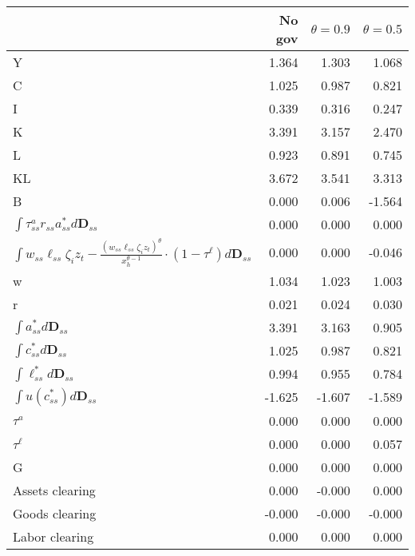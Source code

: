 \begin{tabular}{lrrr}
\toprule
 & No gov & $\theta=0.9$ & $\theta=0.5$ \\
\midrule
Y & 1.364 & 1.303 & 1.068 \\
C & 1.025 & 0.987 & 0.821 \\
I & 0.339 & 0.316 & 0.247 \\
K & 3.391 & 3.157 & 2.470 \\
L & 0.923 & 0.891 & 0.745 \\
KL & 3.672 & 3.541 & 3.313 \\
B & 0.000 & 0.006 & -1.564 \\
$\int \tau^{a}_{ss}r_{ss}a^{*}_{ss}d\mathbf{D}_{ss}$ & 0.000 & 0.000 & 0.000 \\
$\int w_{ss}\ell_{ss} \zeta_{i}z_{t} - \frac{\left(w_{ss}\ell_{ss} \zeta_{i}z_{t}\right)^{\theta}}{ x_{h}^{\theta-1}} \cdot \left(1-\tau^{\ell} \right) d\boldsymbol{D}_{ss}$ & 0.000 & 0.000 & -0.046 \\
w & 1.034 & 1.023 & 1.003 \\
r & 0.021 & 0.024 & 0.030 \\
$\int a^{*}_{ss} d\mathbf{D}_{ss}$ & 3.391 & 3.163 & 0.905 \\
$\int c^{*}_{ss} d\mathbf{D}_{ss}$ & 1.025 & 0.987 & 0.821 \\
$\int \ell^{*}_{ss} d\mathbf{D}_{ss}$ & 0.994 & 0.955 & 0.784 \\
$\int u \left(c^{*}_{ss} \right) d\mathbf{D}_{ss}$ & -1.625 & -1.607 & -1.589 \\
$\tau^{a}$ & 0.000 & 0.000 & 0.000 \\
$\tau^{\ell}$ & 0.000 & 0.000 & 0.057 \\
G & 0.000 & 0.000 & 0.000 \\
Assets clearing & 0.000 & -0.000 & 0.000 \\
Goods clearing & -0.000 & -0.000 & -0.000 \\
Labor clearing & 0.000 & 0.000 & 0.000 \\
\bottomrule
\end{tabular}
